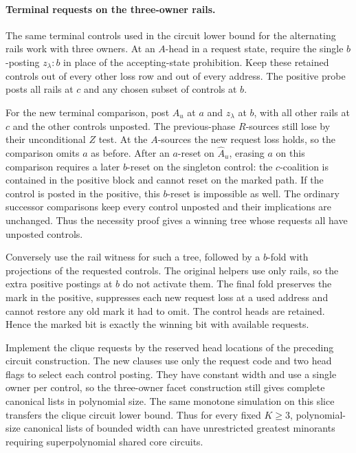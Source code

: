 \paragraph{Terminal requests on the three-owner rails.}
The same terminal controls used in the circuit
lower bound for the alternating rails work with
three owners. At an $A$-head in a request state,
require the single $b$-posting $z_\lambda:b$
in place of the accepting-state prohibition.
Keep these retained controls out of every other
loss row and out of every address. The positive
probe posts all rails at $c$ and any chosen
subset of controls at $b$.

For the new terminal comparison, post
$\widehat A_u$ at $a$ and $z_\lambda$ at $b$,
with all other rails at $c$ and the other
controls unposted. The previous-phase
$R$-sources still lose by their unconditional
$Z$ test. At the $A$-sources the new request
loss holds, so the comparison omits $a$ as
before. After an $a$-reset on $\widehat A_u$,
erasing $a$ on this comparison requires a
later $b$-reset on the singleton control:
the $c$-coalition is contained in the positive
block and cannot reset on the marked path.
If the control is posted in the positive,
this $b$-reset is impossible as well. The
ordinary successor comparisons keep every
control unposted and their implications
are unchanged. Thus the necessity proof
gives a winning tree whose requests all
have unposted controls.

Conversely use the rail witness for such a
tree, followed by a $b$-fold with projections
of the requested controls. The original
helpers use only rails, so the extra positive
postings at $b$ do not activate them. The
final fold preserves the mark in the positive,
suppresses each new request loss at a used
address and cannot restore any old mark it
had to omit. The control heads are retained.
Hence the marked bit is exactly the winning
bit with available requests.

Implement the clique requests by the reserved
head locations of the preceding circuit
construction. The new clauses use only the
request code and two head flags to select
each control posting. They have constant
width and use a single owner per control,
so the three-owner facet construction still
gives complete canonical lists in polynomial
size. The same monotone simulation on this
slice transfers the clique circuit lower bound.
Thus for every fixed $K\ge3$, polynomial-size
canonical lists of bounded width can have
unrestricted greatest minorants requiring
superpolynomial shared core circuits.


